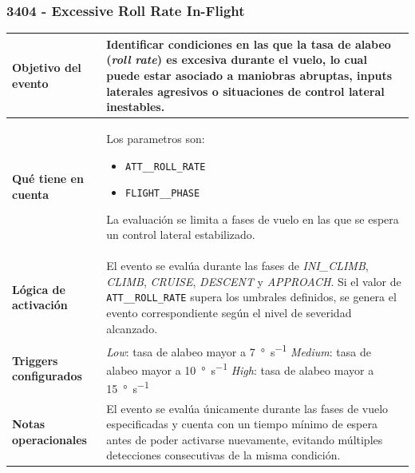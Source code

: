 \documentclass[11pt,a4paper]{article}
\begin{document}
	\subsubsection{3404 - Excessive Roll Rate In-Flight}
	\begin{table}[H]
		\centering
		\renewcommand{\arraystretch}{1.3}
		\begin{tabular}{p{5cm} p{9.5cm}}
			\hline
			\textbf{Objetivo del evento} &
			Identificar condiciones en las que la tasa de alabeo (\textit{roll rate}) es excesiva durante el vuelo, lo cual puede estar asociado a maniobras abruptas, inputs laterales agresivos o situaciones de control lateral inestables. \\
			\hline
			\textbf{Qué tiene en cuenta} & Los parametros son:
			\begin{itemize}
				\item \texttt{ATT\_\_ROLL\_RATE}
				\item \texttt{FLIGHT\_\_PHASE}
			\end{itemize}
			La evaluación se limita a fases de vuelo en las que se espera un control lateral estabilizado. \\
			\hline
			\textbf{Lógica de activación} &
			El evento se evalúa durante las fases de \textit{INI\_CLIMB}, \textit{CLIMB}, \textit{CRUISE}, \textit{DESCENT} y \textit{APPROACH}. Si el valor de \texttt{ATT\_\_ROLL\_RATE} supera los umbrales definidos, se genera el evento correspondiente según el nivel de severidad alcanzado. \\
			\hline
			\textbf{Triggers configurados} &
			\textit{Low}: tasa de alabeo mayor a \SI{7}{\degree\per\second} \newline
			\textit{Medium}: tasa de alabeo mayor a \SI{10}{\degree\per\second} \newline
			\textit{High}: tasa de alabeo mayor a \SI{15}{\degree\per\second} \\
			\hline
			\textbf{Notas operacionales} &
			El evento se evalúa únicamente durante las fases de vuelo especificadas y cuenta con un tiempo mínimo de espera antes de poder activarse nuevamente, evitando múltiples detecciones consecutivas de la misma condición. \\
			\hline
		\end{tabular}
	\end{table}
\end{document}
